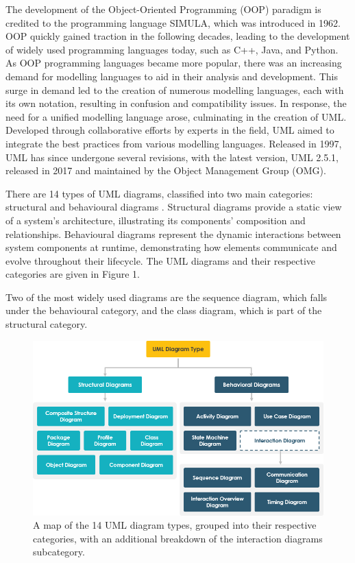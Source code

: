 \documentclass{article}
\begin{document}
{The development of the Object-Oriented Programming (OOP) paradigm is credited to the programming language SIMULA, which was introduced in 1962\cite{Simula}. OOP quickly gained traction in the following decades, leading to the development of widely used programming languages today, such as C++, Java, and Python\cite{Seidl_Scholz_Huemer_Kappel_Duffy_2014}. As OOP programming languages became more popular, there was an increasing demand for modelling languages to aid in their analysis and development. This surge in demand led to the creation of numerous modelling languages, each with its own notation, resulting in confusion and compatibility issues\cite{Seidl_Scholz_Huemer_Kappel_Duffy_2014}. In response, the need for a unified modelling language arose, culminating in the creation of UML. Developed through collaborative efforts by experts in the field, UML aimed to integrate the best practices from various modelling languages\cite{Seidl_Scholz_Huemer_Kappel_Duffy_2014}. Released in 1997, UML has since undergone several revisions, with the latest version, UML 2.5.1, released in 2017 and maintained by the Object Management Group (OMG)\cite{OMG_UML}.

There are 14 types of UML diagrams, classified into two main categories: structural and behavioural diagrams \cite{Seidl_Scholz_Huemer_Kappel_Duffy_2014}. Structural diagrams provide a static view of a system's architecture, illustrating its components' composition and relationships. Behavioural diagrams represent the dynamic interactions between system components at runtime, demonstrating how elements communicate and evolve throughout their lifecycle. The UML diagrams and their respective categories are given in Figure 1.  

Two of the most widely used diagrams are the sequence diagram, which falls under the behavioural category, and the class diagram, which is part of the structural category.

\begin{figure}[H]
    \centering
    \includegraphics[width=1.0\linewidth]{01-uml-diagram-types.png}
    \caption{A map of the 14 UML diagram types, grouped into their respective categories, with an additional breakdown of the interaction diagrams subcategory\cite{visualpara}.}
    \label{fig:UML Diagram Map}
\end{figure}

}
\end{document}
